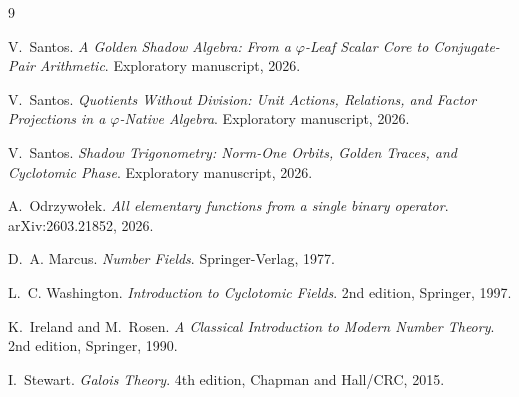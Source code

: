 \documentclass[11pt]{article}
\begin{document}
\begin{thebibliography}{9}

V.~Santos.
\newblock \emph{A Golden Shadow Algebra: From a $\varphi$-Leaf Scalar Core to Conjugate-Pair Arithmetic}.
\newblock Exploratory manuscript, 2026.

V.~Santos.
\newblock \emph{Quotients Without Division: Unit Actions, Relations, and Factor Projections in a $\varphi$-Native Algebra}.
\newblock Exploratory manuscript, 2026.

V.~Santos.
\newblock \emph{Shadow Trigonometry: Norm-One Orbits, Golden Traces, and Cyclotomic Phase}.
\newblock Exploratory manuscript, 2026.

A.~Odrzywo\l{}ek.
\newblock \emph{All elementary functions from a single binary operator}.
\newblock arXiv:2603.21852, 2026.

D.~A. Marcus.
\newblock \emph{Number Fields}.
\newblock Springer-Verlag, 1977.

L.~C. Washington.
\newblock \emph{Introduction to Cyclotomic Fields}.
\newblock 2nd edition, Springer, 1997.

K.~Ireland and M.~Rosen.
\newblock \emph{A Classical Introduction to Modern Number Theory}.
\newblock 2nd edition, Springer, 1990.

I.~Stewart.
\newblock \emph{Galois Theory}.
\newblock 4th edition, Chapman and Hall/CRC, 2015.

\end{thebibliography}
\end{document}
